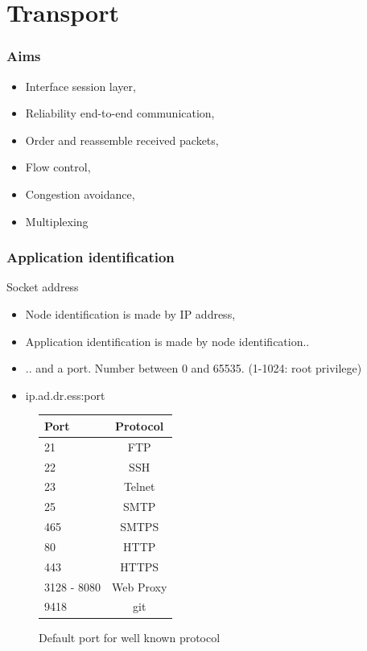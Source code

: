 \section{Transport}
  \begin{frame}
    \frametitle{Aims}
      \begin{itemize}
        \item Interface session layer,\pause
        \item Reliability end-to-end communication,\pause
        \item Order and reassemble received packets,\pause
        \item Flow control,\pause
        \item Congestion avoidance,\pause
        \item Multiplexing
      \end{itemize}
  \end{frame}

  \begin{frame}
    \frametitle{Application identification}
    \begin{block}{Socket address}
      \begin{itemize}
        \item Node identification is made by IP address,\pause
        \item Application identification is made by node identification..\pause
        \item .. and a port. Number between 0 and 65535. (1-1024: root privilege) \pause
        \item \begin{center} ip.ad.dr.ess:port \end{center}
      \end{itemize}
    \end{block}
  \end{frame}

  \begin{frame}
    \begin{figure}
      \centering
      \begin{tabular}{l|c}
        Port & Protocol \\ \hline
        21 & FTP \\ \hline
        22 & SSH \\ \hline
        23 & Telnet \\ \hline
        25 & SMTP \\ \hline
        465 & SMTPS \\ \hline
        80 & HTTP \\ \hline
        443 & HTTPS \\ \hline
        3128 - 8080 & Web Proxy \\ \hline
        9418 & git \\ \hline
      \end{tabular}
      \caption{Default port for well known protocol}
      \label{fig:def-port}
    \end{figure}
  \end{frame}

